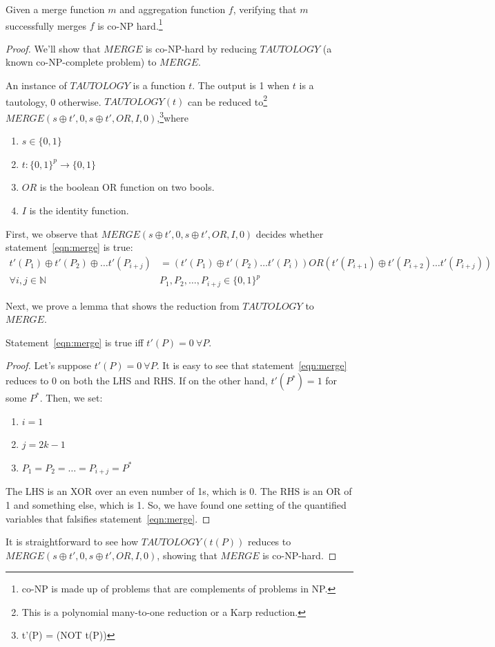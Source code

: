 \begin{theorem}
Given a merge function $m$ and aggregation function $f$, verifying that $m$ successfully
merges $f$ is co-NP hard.\footnote{co-NP is made up of problems
that are complements of problems in NP.}
\end{theorem}
\begin{proof}
We'll show that $MERGE$ is co-NP-hard by reducing $TAUTOLOGY$ (a known
co-NP-complete problem) to $MERGE$.

An instance of $TAUTOLOGY$ is a function $t$. The output is 1 when $t$ is a
tautology, 0 otherwise. $TAUTOLOGY(t)$ can be reduced to\footnote{This is a
polynomial many-to-one reduction or a Karp reduction.} $MERGE(s \oplus t', 0, s
\oplus t', OR, I, 0)$,\footnote{t'(P) = (NOT t(P))}where
\begin{enumerate}
\item $s \in \{0, 1\}$
\item $t : \{0, 1\}^p \rightarrow \{0, 1\}$
\item $OR$ is the boolean OR function on two bools.
\item $I$ is the identity function.
\end{enumerate}

First, we observe that $MERGE(s \oplus t', 0, s \oplus t', OR, I, 0)$ decides whether statement~\ref{eqn:merge} is true:
\begin{align}
t'(P_1) \oplus t'(P_2) \oplus \dots t'(P_{i+j}) & = (t'(P_1) \oplus t'(P_2) \dots t'(P_{i})) OR (t'(P_{i+1}) \oplus t'(P_{i+2}) \dots t'(P_{i+j})) \label{eqn:merge} \\
\forall i, j \in \mathbb{N} \ \ & P_1, P_2, \dots, P_{i+j} \in \{0, 1\}^p \nonumber
\end{align}

Next, we prove a lemma that shows the reduction from $TAUTOLOGY$ to $MERGE$.

\begin{lemma}
Statement~\ref{eqn:merge} is true iff $t'(P) = 0 \ \forall P$.
\end{lemma}
\begin{proof}
Let's suppose $t'(P) = 0 \ \forall P$. It is easy to see that statement~\ref{eqn:merge} reduces to 0 on both the LHS and RHS. If on the other hand, $t'(P^*) = 1$ for some $P^*$. Then, we set:
\begin{enumerate}
\item $i = 1$
\item $j = 2k - 1$
\item $P_1 = P_2 = \dots = P_{i+j} = P^*$
\end{enumerate}
The LHS is an XOR over an even number of 1s, which is 0. The RHS is an OR of 1
and something else, which is 1. So, we have found one setting of the quantified
variables that falsifies statement~\ref{eqn:merge}.
\vspace{\baselineskip}
\end{proof}

It is straightforward to see how $TAUTOLOGY(t(P))$
reduces to $MERGE(s \oplus t', 0, s \oplus t', OR, I, 0)$, showing that $MERGE$
is co-NP-hard.
\end{proof}

